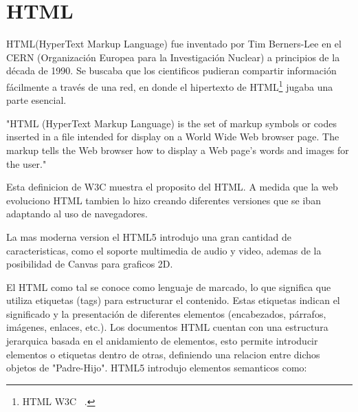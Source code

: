 \documentclass[a4paper, 12pt]{book}
\begin{document}
\section{HTML} 
\label{sec:seccion6}

HTML(HyperText Markup Language) fue inventado por Tim Berners-Lee en el CERN (Organización Europea para la Investigación Nuclear) a principios de la década de 1990. Se buscaba que los cientificos pudieran compartir información fácilmente a través de una red, en donde el hipertexto de HTML\footnote{HTML W3C  ~\cite{w3c-html-intro}.} jugaba una parte esencial.

"HTML (HyperText Markup Language) is the set of markup symbols or codes inserted in a file intended for display on a World Wide Web browser page. The markup tells the Web browser how to display a Web page's words and images for the user." \cite{w3c-html-intro}   

Esta definicion de W3C muestra el proposito del HTML. A medida que la web evoluciono HTML tambien lo hizo creando diferentes versiones que se iban adaptando al uso de navegadores.

La mas moderna version el HTML5 introdujo una gran cantidad de caracteristicas, como el soporte multimedia de audio y video, ademas de la posibilidad de Canvas para graficos 2D.

El HTML como tal se conoce como lenguaje de marcado, lo que significa que utiliza etiquetas (tags) para estructurar el contenido. Estas etiquetas indican el significado y la presentación de diferentes elementos (encabezados, párrafos, imágenes, enlaces, etc.). Los documentos HTML cuentan con una estructura jerarquica basada en el anidamiento de elementos, esto permite introducir elementos o etiquetas dentro de otras, definiendo una relacion entre dichos objetos de "Padre-Hijo". HTML5 introdujo elementos semanticos como:
\end{document}
